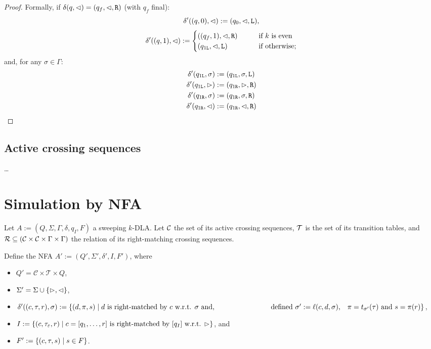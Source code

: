 \begin{proof}
	Formally, if $\delta(q,\lhd)=(q_f,\lhd,\mathtt R)$ (with $q_f$ final):
	\begin{equation*}
		\delta'((q,0),\lhd):=(q_0,\lhd,\mathtt L) \text,
	\end{equation*}
	\begin{equation*}
		\delta'((q,1),\lhd):=\begin{cases}
			((q_f,1),\lhd,\mathtt R) \qquad & \text{if $k$ is even}      \\
			(q_{1\mathtt{L}},\lhd,\mathtt L) \qquad     & \text{if otherwise} \text;
		\end{cases}
	\end{equation*}
	and, for any $\sigma\in\Gamma$:
	\begin{align*}
		\delta'(q_{1\mathtt{L}},\sigma) & :=(q_{1\mathtt{L}},\sigma,\mathtt L) \\
		\delta'(q_{1\mathtt{L}},\rhd)   & :=(q_{1\mathtt{R}},\rhd,\mathtt R)   \\
		\delta'(q_{1\mathtt{R}},\sigma) & :=(q_{1\mathtt{R}},\sigma,\mathtt R) \\
		\delta'(q_{1\mathtt{R}},\lhd)   & :=(q_{1\mathtt{R}},\lhd,\mathtt R)
	\end{align*}

\end{proof}


\subsection{Active crossing sequences}
\dots


\section{Simulation by NFA}
Let $A:=(Q,\Sigma,\Gamma,\delta,q_I,F)$ a sweeping $k$-DLA.
Let $\mathcal C$ the set of its active crossing sequences, $\mathcal T$ is the set of its transition tables, and $\mathcal R\subseteq(\mathcal C\times\mathcal C\times\Gamma\times\Gamma)$ the relation of its right-matching crossing sequences.

Define the NFA $A':=(Q',\Sigma',\delta',I,F')$, where
\begin{itemize}
	\item $Q'=\mathcal C\times\mathcal T\times Q$,
	\item $\Sigma'=\Sigma\cup\{\rhd,\lhd\}$,
	\item $\delta'((c,\tau,r),\sigma):=\{(d,\pi,s) \mid \text{$d$ is right-matched by $c$ w.r.t. $\sigma$ and,}\\
			      \text{\hspace{8em}defined $\sigma':=\ell(c,d,\sigma)$,\quad$\pi=t_{\sigma'}(\tau)$ and $s=\pi(r)$}\}$,
	\item $I:=\{(c,\tau_\varepsilon,r) \mid \text{$c=[q_1,\dots,r]$ is right-matched by $[q_I]$ w.r.t. $\rhd$}\}$, and
	\item $F':=\{(c,\tau,s)\mid s\in F\}$.
\end{itemize}
